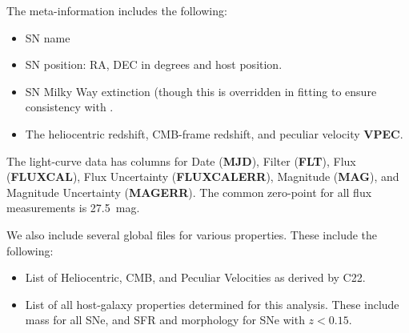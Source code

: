 \documentclass[twocolumn]{aastex63}
\begin{document}
The meta-information includes the following:
\begin{itemize}
    \item SN name
    \item SN position: RA, DEC in degrees and host position.
    \item SN Milky Way extinction (though this is overridden in fitting to ensure consistency with \cite{Schlafly11}.
    \item The heliocentric redshift, CMB-frame redshift, and peculiar velocity \textbf{VPEC}.
\end{itemize}
The light-curve data has columns for Date (\textbf{MJD}), Filter (\textbf{FLT}), Flux (\textbf{FLUXCAL}), Flux Uncertainty (\textbf{FLUXCALERR}), Magnitude (\textbf{MAG}), and Magnitude Uncertainty (\textbf{MAGERR}).  The common zero-point for all flux measurements is 27.5~mag.


We also include several global files for various properties.  These include the following:
\begin{itemize}
    \item List of Heliocentric, CMB, and Peculiar Velocities as derived by C22.
    \item List of all host-galaxy properties determined for this analysis.  These include mass for all SNe, and SFR and morphology for SNe with $z<0.15$.
\end{itemize}
\end{document}
